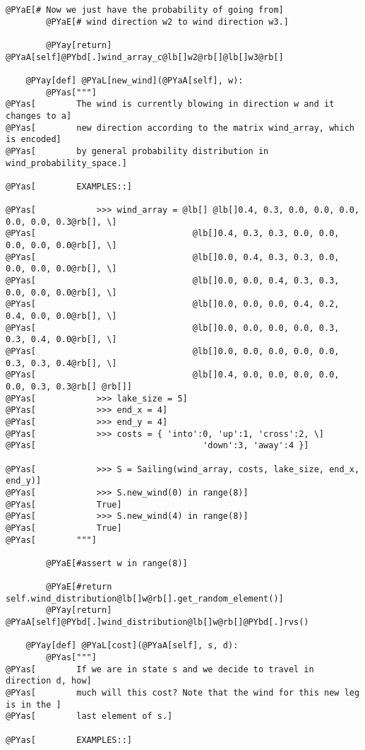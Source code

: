 \begin{Verbatim}[commandchars=@\[\]]
        @PYaE[# Now we just have the probability of going from]
        @PYaE[# wind direction w2 to wind direction w3.]

        @PYay[return] @PYaA[self]@PYbd[.]wind_array_c@lb[]w2@rb[]@lb[]w3@rb[]

    @PYay[def] @PYaL[new_wind](@PYaA[self], w):
        @PYas["""]
@PYas[        The wind is currently blowing in direction w and it changes to a]
@PYas[        new direction according to the matrix wind_array, which is encoded]
@PYas[        by general probability distribution in wind_probability_space.]

@PYas[        EXAMPLES::]

@PYas[            >>> wind_array = @lb[] @lb[]0.4, 0.3, 0.0, 0.0, 0.0, 0.0, 0.0, 0.3@rb[], \]
@PYas[                               @lb[]0.4, 0.3, 0.3, 0.0, 0.0, 0.0, 0.0, 0.0@rb[], \]
@PYas[                               @lb[]0.0, 0.4, 0.3, 0.3, 0.0, 0.0, 0.0, 0.0@rb[], \]
@PYas[                               @lb[]0.0, 0.0, 0.4, 0.3, 0.3, 0.0, 0.0, 0.0@rb[], \]
@PYas[                               @lb[]0.0, 0.0, 0.0, 0.4, 0.2, 0.4, 0.0, 0.0@rb[], \]
@PYas[                               @lb[]0.0, 0.0, 0.0, 0.0, 0.3, 0.3, 0.4, 0.0@rb[], \]
@PYas[                               @lb[]0.0, 0.0, 0.0, 0.0, 0.0, 0.3, 0.3, 0.4@rb[], \]
@PYas[                               @lb[]0.4, 0.0, 0.0, 0.0, 0.0, 0.0, 0.3, 0.3@rb[] @rb[]]
@PYas[            >>> lake_size = 5]
@PYas[            >>> end_x = 4]
@PYas[            >>> end_y = 4]
@PYas[            >>> costs = { 'into':0, 'up':1, 'cross':2, \]
@PYas[                                 'down':3, 'away':4 }]

@PYas[            >>> S = Sailing(wind_array, costs, lake_size, end_x, end_y)]
@PYas[            >>> S.new_wind(0) in range(8)]
@PYas[            True]
@PYas[            >>> S.new_wind(4) in range(8)]
@PYas[            True]
@PYas[        """]

        @PYaE[#assert w in range(8)]

        @PYaE[#return self.wind_distribution@lb[]w@rb[].get_random_element()]
        @PYay[return] @PYaA[self]@PYbd[.]wind_distribution@lb[]w@rb[]@PYbd[.]rvs()

    @PYay[def] @PYaL[cost](@PYaA[self], s, d):
        @PYas["""]
@PYas[        If we are in state s and we decide to travel in direction d, how]
@PYas[        much will this cost? Note that the wind for this new leg is in the ]
@PYas[        last element of s.]

@PYas[        EXAMPLES::]


\end{Verbatim}
